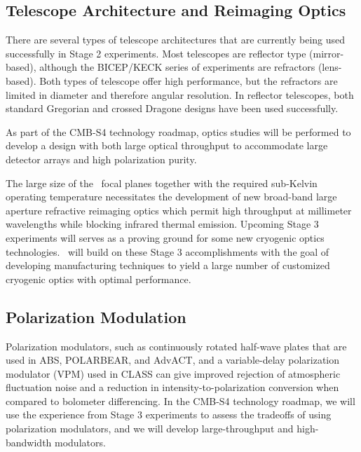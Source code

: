 \subsection{Telescope Architecture and Reimaging Optics }

There are several types of telescope architectures that are currently
being used successfully in Stage 2 experiments.   Most telescopes
are reflector type (mirror-based), although the BICEP/KECK series of experiments are
refractors (lens-based).   Both types of telescope offer high performance, but 
the refractors are limited in diameter and therefore angular resolution.  
In reflector telescopes, both standard Gregorian and crossed Dragone 
designs have been used successfully.   

As part of the CMB-S4 technology roadmap, optics studies will be performed
to develop a design with both large optical throughput to accommodate large
detector arrays and high polarization purity.

The large size of the
  \cmbexp\ focal planes together with the required sub-Kelvin
  operating temperature necessitates the development of new broad-band
  large aperture  refractive reimaging optics which permit high throughput at
  millimeter wavelengths while blocking infrared thermal
  emission. Upcoming Stage 3 experiments will serves as a proving
  ground for some new cryogenic optics technologies. \cmbexp\ will
  build on these Stage 3 accomplishments with the goal of developing
  manufacturing techniques to yield a large number of customized
  cryogenic optics with optimal performance.

\subsection{Polarization Modulation}

Polarization modulators, such as continuously rotated half-wave plates that are used in 
ABS, POLARBEAR, and AdvACT, and a variable-delay polarization modulator (VPM) used
in CLASS can give improved rejection of atmospheric fluctuation noise and a reduction 
in intensity-to-polarization conversion when compared to bolometer differencing.    In the
CMB-S4 technology roadmap, we will use the experience from Stage 3 experiments to assess
the tradeoffs of using polarization modulators, and we will develop large-throughput and 
high-bandwidth modulators.  




     
     
%




